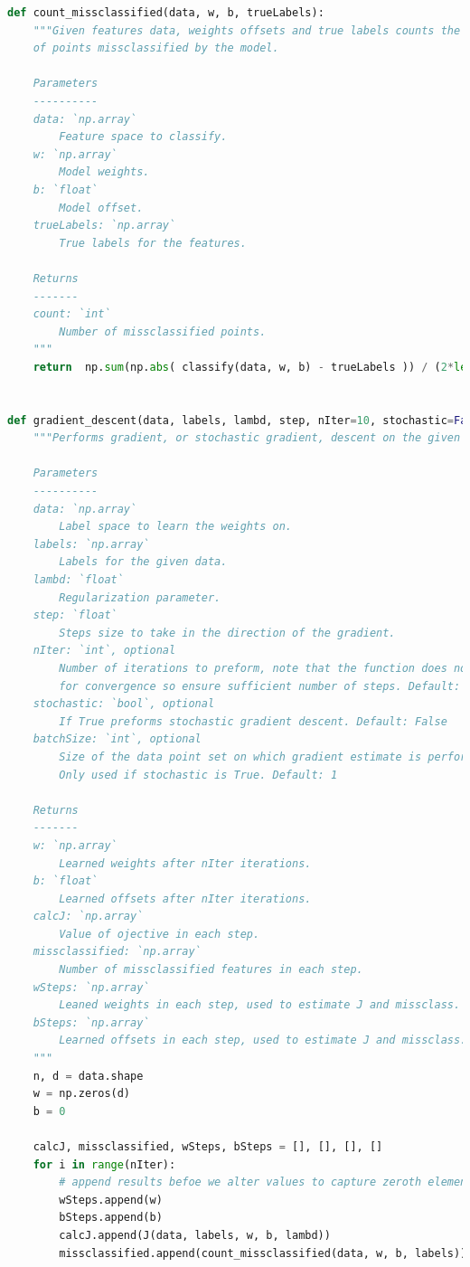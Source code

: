 \documentclass{article}
\newcommand{\1}{\mathbf{1}}
\begin{document}
\begin{lstlisting}[language=Python]
def count_missclassified(data, w, b, trueLabels):
    """Given features data, weights offsets and true labels counts the number
    of points missclassified by the model.

    Parameters
    ----------
    data: `np.array`
        Feature space to classify.
    w: `np.array`
        Model weights.
    b: `float`
        Model offset.
    trueLabels: `np.array`
        True labels for the features.

    Returns
    -------
    count: `int`
        Number of missclassified points.
    """
    return  np.sum(np.abs( classify(data, w, b) - trueLabels )) / (2*len(trueLabels))


def gradient_descent(data, labels, lambd, step, nIter=10, stochastic=False,  batchSize=1):
    """Performs gradient, or stochastic gradient, descent on the given data.

    Parameters
    ----------
    data: `np.array`
        Label space to learn the weights on.
    labels: `np.array`
        Labels for the given data.
    lambd: `float`
        Regularization parameter.
    step: `float`
        Steps size to take in the direction of the gradient.
    nIter: `int`, optional
        Number of iterations to preform, note that the function does not test
        for convergence so ensure sufficient number of steps. Default: 10
    stochastic: `bool`, optional
        If True preforms stochastic gradient descent. Default: False
    batchSize: `int`, optional
        Size of the data point set on which gradient estimate is performed on.
        Only used if stochastic is True. Default: 1

    Returns
    -------
    w: `np.array`
        Learned weights after nIter iterations.
    b: `float`
        Learned offsets after nIter iterations.
    calcJ: `np.array`
        Value of ojective in each step.
    missclassified: `np.array`
        Number of missclassified features in each step.
    wSteps: `np.array`
        Leaned weights in each step, used to estimate J and missclass. on test.
    bSteps: `np.array`
        Learned offsets in each step, used to estimate J and missclass. on test.
    """
    n, d = data.shape
    w = np.zeros(d)
    b = 0

    calcJ, missclassified, wSteps, bSteps = [], [], [], []
    for i in range(nIter):
        # append results befoe we alter values to capture zeroth element correctly
        wSteps.append(w)
        bSteps.append(b)
        calcJ.append(J(data, labels, w, b, lambd))
        missclassified.append(count_missclassified(data, w, b, labels))


\end{lstlisting}
\end{document}
